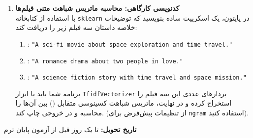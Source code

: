 \documentclass[a4paper,12pt]{article}
\begin{document}
\begin{enumerate}
\item \textbf{کدنویسی کارگاهی: محاسبه ماتریس شباهت متنی فیلم‌ها}
\\
با استفاده از کتابخانه \texttt{sklearn} در پایتون، یک اسکریپت ساده بنویسید که توضیحات خلاصه داستان سه فیلم زیر را دریافت کند:
\begin{enumerate}
    \item {}: \small{\texttt{"A sci-fi movie about space exploration and time travel."}} 
    \item {}: \small{\texttt{"A romance drama about two people in love."}}
    \item {}: \small{\texttt{"A science fiction story with time travel and space mission."}}
\end{enumerate}
برنامه شما باید با ابزار \texttt{TfidfVectorizer} بردارهای عددی این سه فیلم را استخراج کرده  و در نهایت، ماتریس شباهت کسینوسی متقابل () بین آن‌ها را محاسبه و در خروجی چاپ کند. (از تنظیمات پیش‌فرض برای \texttt{ngram} استفاده کنید).

\end{enumerate}

\vspace{0.5cm}
\noindent
\textbf{تاریخ تحویل:} تا یک روز قبل از آزمون پایان ترم
\end{document}
